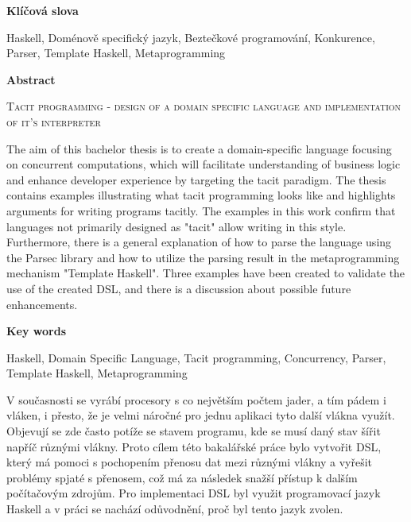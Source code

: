 \documentclass[male,czech]{kithesis}
\newcommand{\TITULen}{Tacit programming - design of a domain specific language and implementation of it's interpreter} %
\begin{document}

\textbf{\textsf{Klíčová slova}}

Haskell, Doménově specifický jazyk, Beztečkové programování, Konkurence, Parser, Template Haskell, Metaprogramming


\vspace{1em}
\hrulefill
\vspace{1em}

\textbf{\textsf{Abstract}}

\textsc{\TITULen}


The aim of this bachelor thesis is to create a 
domain-specific language focusing on concurrent computations, 
which will facilitate understanding of business logic and 
enhance developer experience by targeting the tacit paradigm. 
The thesis contains examples illustrating what 
tacit programming looks like and 
highlights arguments for writing programs tacitly. 
The examples in this work confirm that 
languages not primarily designed as "tacit" allow writing in this style.
Furthermore, 
there is a general explanation 
of how to parse the language using the Parsec library and 
how to utilize the parsing result in 
the metaprogramming mechanism "Template Haskell". 
Three examples have been created to validate the use of the created DSL,
and there is a discussion about possible future enhancements.

\textbf{\textsf{Key words}}

Haskell, Domain Specific Language, Tacit programming, Concurrency, Parser, Template Haskell, Metaprogramming

{
  \hypersetup{linkcolor=black}
  \tableofcontents
}


V současnosti se vyrábí procesory s co největším počtem jader, 
a tím pádem i vláken, 
i přesto,
že je velmi náročné pro jednu aplikaci tyto další vlákna využít.
Objevují se zde často potíže se stavem programu,
kde se musí daný stav šířit napříč různými vlákny.
Proto cílem této bakalářské práce bylo vytvořit DSL, 
který má pomoci s pochopením přenosu dat mezi různými vlákny
a vyřešit problémy spjaté s přenosem,
což má za následek snažší přístup k dalším počítačovým zdrojům.
Pro implementaci DSL byl využit programovací jazyk Haskell a 
v práci se nachází odůvodnění,
proč byl tento jazyk zvolen. 
\end{document}
